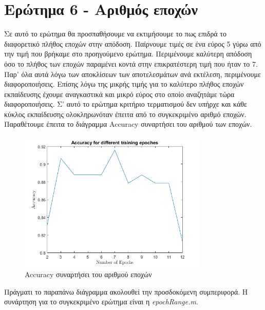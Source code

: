 \documentclass[12pt]{article}
\begin{document}
\section*{Ερώτημα 6 - Αριθμός εποχών}
Σε αυτό το ερώτημα θα προσπαθήσουμε να εκτιμήσουμε το πως επιδρά το διαφορετικό πλήθος εποχών στην απόδοση. Παίρνουμε τιμές σε ένα εύρος 5 γύρω από την τιμή που βρήκαμε στο προηγούμενο ερώτημα. Περιμένουμε καλύτερη απόδοση όσο το πλήθος των εποχών παραμένει κοντά στην επικρατέστερη τιμή που ήταν το 7. Παρ' όλα αυτά λόγω των αποκλίσεων των αποτελεσμάτων ανά εκτέλεση, περιμένουμε διαφοροποιήσεις. Επίσης λόγω της μικρής τιμής για το καλύτερο πλήθος εποχών εκπαίδευσης έχουμε αναγκαστικά και μικρό εύρος στο οποίο αναζητάμε τώρα διαφοροποιήσεις. Σ' αυτό το ερώτημα κριτήριο τερματισμού δεν υπήρχε και κάθε κύκλος εκπαίδευσης ολοκληρωνόταν έπειτα από το συγκεκριμένο αριθμό εποχών. Παραθέτουμε έπειτα το διάγραμμα Accuracy συναρτήσει του αριθμού των εποχών.
\begin{figure}[H]
	 		\centering
			\includegraphics[width=0.8\textwidth]{fakelos/6d-7epochRange.png}
			\caption{ Accuracy συναρτήσει του αριθμού εποχών}
			\label{fig:6.epochs}
		\end{figure}
		
Πράγματι το παραπάνω διάγραμμα ακολουθεί την προσδοκόμενη συμπεριφορά. Η συνάρτηση για το συγκεκριμένο ερώτημα είναι η \textit{epochRange.m}.
\end{document}
